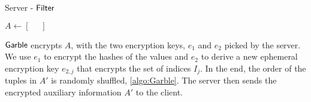 \begin{algorithm}[H]
    \LinesNumbered
    \caption{Server - $ \mathsf{{Filter}} $}
    \label{algo:Filter}

    \vspace*{0.48cm}

    $ A \gets \left[ \phantom{=}\right] $


    \vspace*{0.48cm}

\end{algorithm}

$ \mathsf{{Garble}} $ encrypts $ A $, with the two encryption keys, $ e_1 $ and $ e_2 $ picked by the server. We use $ e_1 $ to encrypt the hashes of the values and $ e_2 $ to derive a new ephemeral encryption key $ e_{2,j} $ that encrypts the set of indices $ I_j $. In the end, the order of the tuples in $ A' $ is randomly shuffled, \cref{algo:Garble}. The server then sends the encrypted auxiliary information $ A' $ to the client.

\hfill


